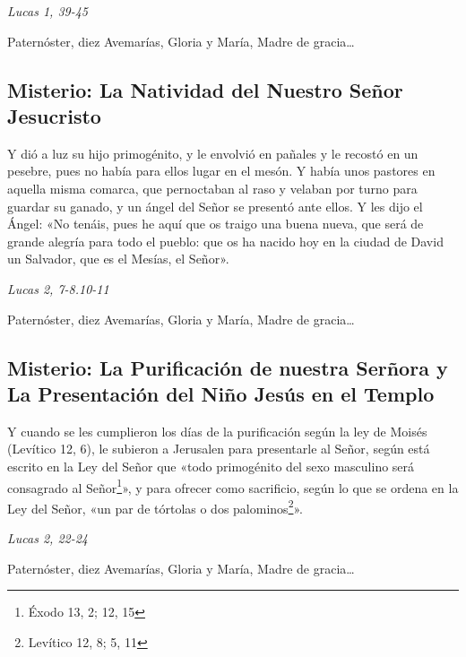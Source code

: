 \documentclass[./rosary.tex]{subfiles}
\newcounter{joyful-counter}
\begin{document}
\begin{flushright}
      \emph{Lucas 1, 39-45}
\end{flushright}

Paternóster, diez Avemarías, Gloria y María, Madre de gracia{\ldots}

\bigskip

\subsection*{ Misterio: La Natividad del Nuestro Señor Jesucristo}

Y dió a luz su hijo primogénito, y le envolvió en pañales y le recostó en un pesebre, pues no había para ellos lugar en el mesón.
Y había unos pastores en aquella misma comarca, que pernoctaban al raso y velaban por turno para guardar su ganado,
y un ángel del  Señor se presentó ante ellos. Y les dijo el Ángel: «No tenáis, pues he aquí que os traigo una buena nueva,
que será de grande alegría para todo el pueblo: que os ha nacido hoy en la ciudad de David un Salvador, que es el Mesías, el Señor».

\begin{flushright}
      \emph{Lucas 2, 7-8.10-11}
\end{flushright}

Paternóster, diez Avemarías, Gloria y María, Madre de gracia{\ldots}

\bigskip

\subsection*{ Misterio: La Purificación de nuestra Serñora y La Presentación del Niño Jesús en el Templo}

Y cuando se les cumplieron los días de la purificación según la ley de Moisés (Levítico 12, 6),
le subieron a Jerusalen para presentarle al Señor, según está escrito en la Ley del Señor que «todo primogénito
del sexo masculino será consagrado al Señor\footnote{Éxodo 13, 2; 12, 15\label{primogenito}}», y para ofrecer como sacrificio,
según lo que se ordena en la Ley del Señor, «un par de tórtolas o dos palominos\footnote{Levítico 12, 8; 5, 11\label{sacrificio}}».
\begin{flushright}
      \emph{Lucas 2, 22-24}
\end{flushright}

Paternóster, diez Avemarías, Gloria y María, Madre de gracia{\ldots}
\end{document}
